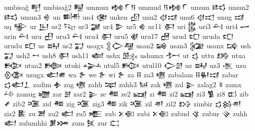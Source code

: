  umbisaĝ  𒋃   
 umbisaĝ2  𒋄   
 ummux  𒂔𒇲𒀀    
 ummud  𒀀𒂔𒇲    
 umum  𒌣   
 umun2  𒌣   
 umun3  𒄴   
 un  𒌦   
 un4  𒂬   
 unken  𒌺   
 unu2  𒋼𒀕    
 unu6  𒋼𒀊    
 unug  𒀕   
 uq  𒊌   
 ur  𒌨   
 ur2  𒌫   
 ur3  𒃡   
 ur4  𒌴   
 ur5  𒄯   
 ur11  𒀳   
 uri  𒌵   
 uri3  𒌶   
 uri4  𒅂   
 urin  𒌶   
 uru  𒌷   
 uru3  𒌶   
 uru4  𒀳   
 uru5  𒋽   
 uru17  𒍇   
 urud  𒍏   
 uruda  𒍏   
 urudu  𒍏   
 us  𒊻   
 us2  𒍑   
 usagx  𒉭𒀖𒆷        
 usan2  𒄝   
 usan3  𒉮   
 usanx  𒄙   
 ush  𒍑   
 ush2  𒍗   
 ush8  𒀳   
 ush11  𒅜   
 ushx  𒍖   
 ushumx  𒍘   
 ut  𒌓   
 uttu  𒋸   
 utua  𒁭   
 utua2  𒁦   
 utuki  𒍙   
 utul5  𒁟   
 utul10  𒀖𒇻    
 uz  𒊻   
 uz3  𒍚   
 uzu  𒍜   
 uzugx  𒅗𒌑    
 wa  𒉿   
 we  𒉿   
 wi  𒉿   
 za  𒍝   
 za3  𒍠   
 zabalam  𒍝𒈽𒀕    
 zabar  𒌓𒅗𒁇    
 zadim  𒈯   
 zag  𒍠   
 zahh  𒉈   
 zahh3  𒀄   
 zak  𒍠   
 zal  𒉌   
 zalag2  𒂟   
 zamx  𒍡   
 zamug  𒁾   
 zar  𒇡   
 zar2  𒉌   
 ze  𒍣   
 ze2  𒍢   
 zi  𒍣   
 zi2  𒍢   
 zi3  𒍥   
 zi8  𒆗   
 zib  𒍦   
 zib2  𒍨   
 zid  𒍣   
 zig  𒍨   
 zig3  𒍣   
 zik  𒍨   
 zil  𒉣   
 zil2  𒋳   
 zimbir  𒌓𒄒𒉣    
 ziz2  𒍩   
 zu  𒍪   
 zu2  𒅗   
 zu5  𒍫   
 zub  𒉽𒈿    
 zubi  𒉽𒈿    
 zubud  𒄪   
 zubur  𒍭   
 zuhh  𒅗   
 zulumhhi  𒋠𒋤    
 zum  𒍮   
 zur  𒀫   
